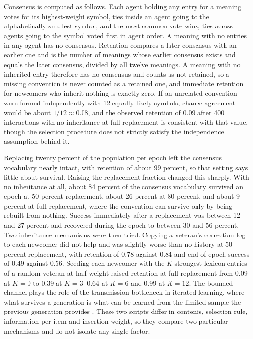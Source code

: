 \documentclass[11pt]{article}
\begin{document}
Consensus is computed as follows. Each agent holding any entry for a meaning votes for its highest-weight symbol, ties inside an agent going to the alphabetically smallest symbol, and the most common vote wins, ties across agents going to the symbol voted first in agent order. A meaning with no entries in any agent has no consensus. Retention compares a later consensus with an earlier one and is the number of meanings whose earlier consensus exists and equals the later consensus, divided by all twelve meanings. A meaning with no inherited entry therefore has no consensus and counts as not retained, so a missing convention is never counted as a retained one, and immediate retention for newcomers who inherit nothing is exactly zero. If an unrelated convention were formed independently with 12 equally likely symbols, chance agreement would be about $1/12\approx 0.08$, and the observed retention of 0.09 after 400 interactions with no inheritance at full replacement is consistent with that value, though the selection procedure does not strictly satisfy the independence assumption behind it.

Replacing twenty percent of the population per epoch left the consensus vocabulary nearly intact, with retention of about 99 percent, so that setting says little about survival. Raising the replacement fraction changed this sharply. With no inheritance at all, about 84 percent of the consensus vocabulary survived an epoch at 50 percent replacement, about 26 percent at 80 percent, and about 9 percent at full replacement, where the convention can survive only by being rebuilt from nothing. Success immediately after a replacement was between 12 and 27 percent and recovered during the epoch to between 30 and 56 percent. Two inheritance mechanisms were then tried. Copying a veteran's correction log to each newcomer did not help and was slightly worse than no history at 50 percent replacement, with retention of 0.78 against 0.84 and end-of-epoch success of 0.49 against 0.56. Seeding each newcomer with the $K$ strongest lexicon entries of a random veteran at half weight raised retention at full replacement from 0.09 at $K=0$ to 0.39 at $K=3$, 0.64 at $K=6$ and 0.99 at $K=12$. The bounded channel plays the role of the transmission bottleneck in iterated learning, where what survives a generation is what can be learned from the limited sample the previous generation provides \cite{smith2003iterated,kirby2008cumulative}. These two scripts differ in contents, selection rule, information per item and insertion weight, so they compare two particular mechanisms and do not isolate any single factor.
\end{document}
